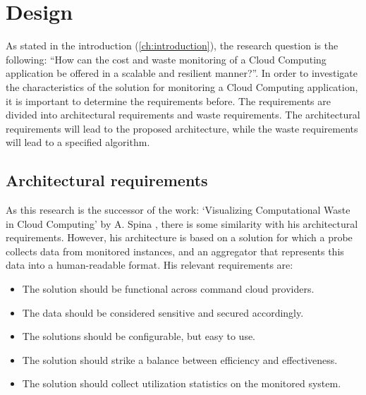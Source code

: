 \chapter{Design}\label{ch:design} %
As stated in the introduction (\autoref{ch:introduction}), the research question is the following: ``How can the cost and waste monitoring of a Cloud Computing application be offered in a scalable and resilient manner?''. In order to investigate the characteristics of the solution for monitoring a Cloud Computing application, it is important to determine the requirements before. The requirements are divided into architectural requirements and waste requirements. The architectural requirements will lead to the proposed architecture, while the waste requirements will lead to a specified algorithm.

\section{Architectural requirements} \label{sec:architectural_req}
As this research is the successor of the work: `Visualizing Computational Waste in Cloud Computing' by A. Spina \cite{spina}, there is some similarity with his architectural requirements. However, his architecture is based on a solution for which a probe collects data from monitored instances, and an aggregator that represents this data into a human-readable format. His relevant requirements are:
\begin{itemize}
    \item The solution should be functional across command cloud providers.
    \item The data should be considered sensitive and secured accordingly.
    \item The solutions should be configurable, but easy to use.
    \item The solution should strike a balance between efficiency and effectiveness.
    \item The solution should collect utilization statistics on the monitored system. 
\end{itemize}

